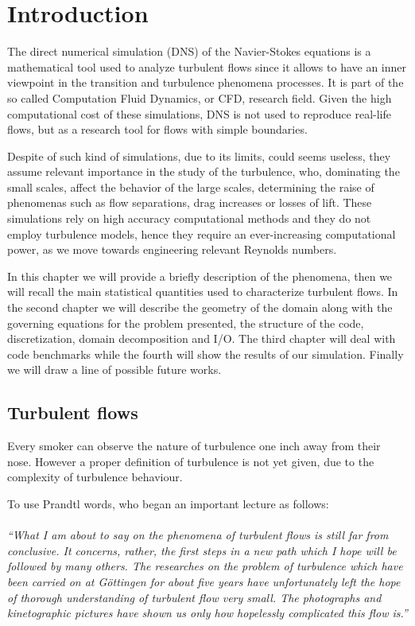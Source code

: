 \chapter{Introduction}
The direct numerical simulation (DNS) of the Navier-Stokes equations is a mathematical tool used to analyze turbulent flows since it allows to have an inner viewpoint in the transition and turbulence phenomena processes. It is part of the so called Computation Fluid Dynamics, or CFD, research field. 
Given the high computational cost of these simulations, DNS is not used to reproduce real-life flows, but as a research tool for flows with simple boundaries\cite{dns:tool}. \par
Despite of such kind of simulations, due to its limits, could seems useless, they assume relevant importance in the study of the turbulence, who, dominating the small scales, affect the behavior of the large scales, determining the raise of phenomenas such as flow separations, drag increases or losses of lift.
These simulations rely on high accuracy computational methods and they do not employ turbulence models, hence they require an ever-increasing computational power, as we move towards engineering relevant Reynolds numbers.
\par
In this chapter we will provide a briefly description of the phenomena, then we will recall the main statistical quantities used to characterize turbulent flows. In the second chapter we will describe the geometry of the domain along with the governing equations for the problem presented, the structure of the code, discretization, domain decomposition and I/O.
The third chapter will deal with code benchmarks while the fourth will show the results of our simulation. Finally we will draw a line of possible future works.

\section{Turbulent flows}
Every smoker can observe the nature of turbulence one inch away from their nose.
However a proper definition of turbulence is not yet given, due to the complexity of turbulence behaviour. \par
To use Prandtl words, who began an important lecture as follows: \\~\\
\emph{``What I am about to say on the phenomena of turbulent flows is still far from conclusive. It concerns, rather, the first steps in a new path which I hope will be followed by many others. The researches on the problem of turbulence which have been carried on at G\"{o}ttingen for about five years have unfortunately left the hope of thorough understanding of turbulent flow very small. The photographs and kinetographic pictures have shown us only how hopelessly complicated this flow is.''} \\~\\

